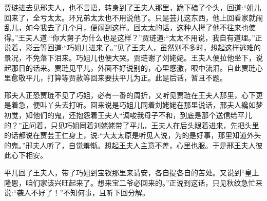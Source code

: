 \begin{parag}
    贾琏进去见邢夫人，也不言语，转身到了王夫人那里，跪下磕了个头，回道:“姐儿回来了，全亏太太。环兄弟太太也不用说他了。只是芸儿这东西，他上回看家就闹乱儿，如今我去了几个月，便闹到这样。回太太的话，这种人撵了他不往来也使得。”王夫人道:“你大舅子为什么也是这样？”贾琏道:“太太不用说，我自有道理。”正说着，彩云等回道:“巧姐儿进来了。”见了王夫人，虽然别不多时，想起这样逃难的景况，不免落下泪来。巧姐儿也便大哭。贾琏谢了刘姥姥。王夫人便拉他坐下，说起那日的话来。贾琏见平儿，外面不好说别的，心里感激，眼中流泪。自此贾琏心里愈敬平儿，打算等贾赦等回来要扶平儿为正。此是后话，暂且不题。
\end{parag}


\begin{parag}
    邢夫人正恐贾琏不见了巧姐，必有一番的周折，又听见贾琏在王夫人那里，心下更是着急，便叫丫头去打听。回来说是巧姐儿同着刘姥姥在那里说话，邢夫人纔如梦初觉，知他们的鬼，还抱怨着王夫人“调唆我母子不和，到底是那个送信给平儿的？”正问着，只见巧姐同着刘姥姥带了平儿，王夫人在后头跟着进来，先把头里的话都说在贾芸王仁身上，说:“大太太原是听见人说，为的是好事，那里知道外头的鬼。”邢夫人听了，自觉羞惭。想起王夫人主意不差，心里也服。于是邢王夫人彼此心下相安。
\end{parag}


\begin{parag}
    平儿回了王夫人，带了巧姐到宝钗那里来请安，各自提各自的苦处。又说到“皇上隆恩，咱们家该兴旺起来了。想来宝二爷必回来的。”正说到这话，只见秋纹急忙来说:“袭人不好了！”不知何事，且听下回分解。
\end{parag}